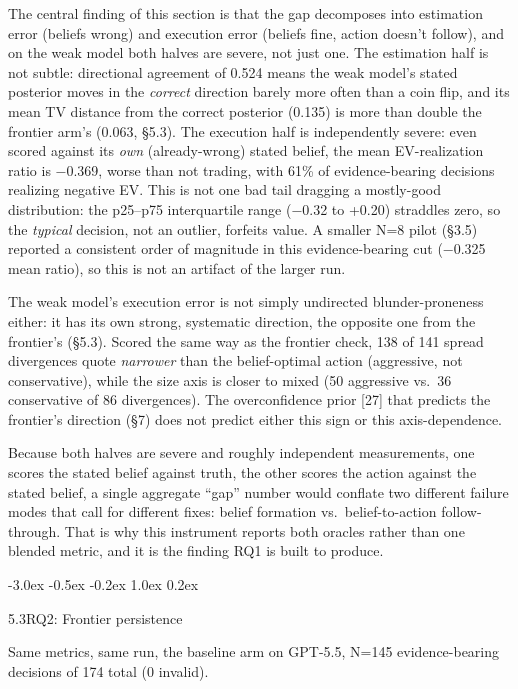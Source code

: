 \documentclass[
  11pt,
]{article}
\makeatletter
\renewcommand{\subsection}{%
  \@startsection{subsection}{2}{\z@}%
                {-3.0ex \@plus -0.5ex \@minus -0.2ex}%
                { 1.0ex \@plus  0.2ex}%
                {\normalsize\bf\raggedright}%
}
\makeatother
\begin{document}
The central finding of this section is that the gap decomposes into estimation error (beliefs wrong) and execution error (beliefs fine, action doesn't follow), and on the weak model both halves are severe, not just one. The estimation half is not subtle: directional agreement of 0.524 means the weak model's stated posterior moves in the \emph{correct} direction barely more often than a coin flip, and its mean TV distance from the correct posterior (0.135) is more than double the frontier arm's (0.063, §5.3). The execution half is independently severe: even scored against its \emph{own} (already-wrong) stated belief, the mean EV-realization ratio is −0.369, worse than not trading, with 61\% of evidence-bearing decisions realizing negative EV. This is not one bad tail dragging a mostly-good distribution: the p25--p75 interquartile range (−0.32 to +0.20) straddles zero, so the \emph{typical} decision, not an outlier, forfeits value. A smaller N=8 pilot (§3.5) reported a consistent order of magnitude in this evidence-bearing cut (−0.325 mean ratio), so this is not an artifact of the larger run.

The weak model's execution error is not simply undirected blunder-proneness either: it has its own strong, systematic direction, the opposite one from the frontier's (§5.3). Scored the same way as the frontier check, 138 of 141 spread divergences quote \emph{narrower} than the belief-optimal action (aggressive, not conservative), while the size axis is closer to mixed (50 aggressive vs.~36 conservative of 86 divergences). The overconfidence prior {[}27{]} that predicts the frontier's direction (§7) does not predict either this sign or this axis-dependence.

Because both halves are severe and roughly independent measurements, one scores the stated belief against truth, the other scores the action against the stated belief, a single aggregate ``gap'' number would conflate two different failure modes that call for different fixes: belief formation vs.~belief-to-action follow-through. That is why this instrument reports both oracles rather than one blended metric, and it is the finding RQ1 is built to produce.

\subsection{5.3\quad RQ2: Frontier persistence}\label{rq2-frontier-persistence}

Same metrics, same run, the baseline arm on GPT-5.5, N=145 evidence-bearing decisions of 174 total (0 invalid).
\end{document}
